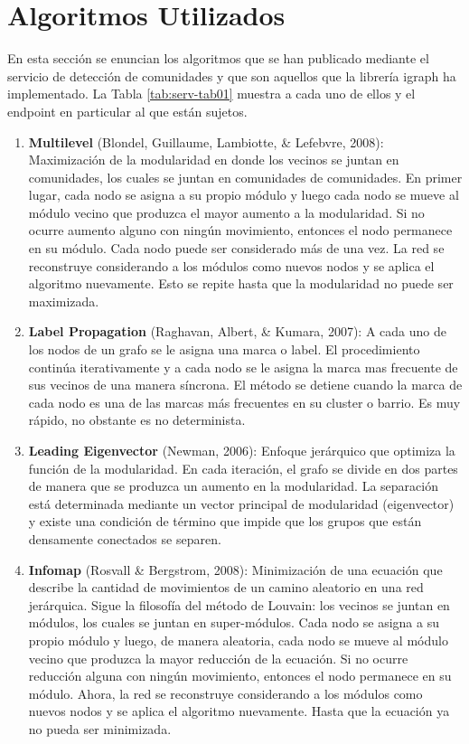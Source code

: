 \section{Algoritmos Utilizados}

En esta sección se enuncian los algoritmos que se han publicado mediante el servicio de detección de comunidades y que son aquellos que la librería igraph ha implementado. La Tabla \ref{tab:serv-tab01} muestra a cada uno de ellos y el endpoint en particular al que están sujetos.

\begin{enumerate}[I]
  \item \textbf{Multilevel} (Blondel, Guillaume, Lambiotte, \& Lefebvre, 2008): Maximización de la modularidad en donde los vecinos se juntan en comunidades, los cuales se juntan en comunidades de comunidades. En primer lugar, cada nodo se asigna a su propio módulo y luego cada nodo se mueve al módulo vecino que produzca el mayor aumento a la modularidad. Si no ocurre aumento alguno con ningún movimiento, entonces el nodo permanece en su módulo. Cada nodo puede ser considerado más de una vez. La red se reconstruye considerando a los módulos como nuevos nodos y se aplica el algoritmo nuevamente. Esto se repite hasta que la modularidad no puede ser maximizada.
  \item \textbf{Label Propagation} (Raghavan, Albert, \& Kumara, 2007): A cada uno de los nodos de un grafo se le asigna una marca o label. El procedimiento continúa iterativamente y a cada nodo se le asigna la marca mas frecuente de sus vecinos de una manera síncrona. El método se detiene cuando la marca de cada nodo es una de las marcas más frecuentes en su cluster o barrio. Es muy rápido, no obstante es no determinista.
  \item \textbf{Leading Eigenvector} (Newman, 2006): Enfoque jerárquico que optimiza la función de la modularidad. En cada iteración, el grafo se divide en dos partes de manera que se produzca un aumento en la modularidad. La separación está determinada mediante un vector principal de modularidad (eigenvector) y existe una condición de término que impide que los grupos que están densamente conectados se separen.
  \item \textbf{Infomap} (Rosvall \& Bergstrom, 2008): Minimización de una ecuación que describe la cantidad de movimientos de un camino aleatorio en una red jerárquica. Sigue la filosofía del método de Louvain: los vecinos se juntan en módulos, los cuales se juntan en super-módulos. Cada nodo se asigna a su propio módulo y luego, de manera aleatoria, cada nodo se mueve al módulo vecino que produzca la mayor reducción de la ecuación. Si no ocurre reducción alguna con ningún movimiento, entonces el nodo permanece en su módulo. Ahora, la red se reconstruye considerando a los módulos como nuevos nodos y se aplica el algoritmo nuevamente. Hasta que la ecuación ya no pueda ser minimizada.

\end{enumerate}
